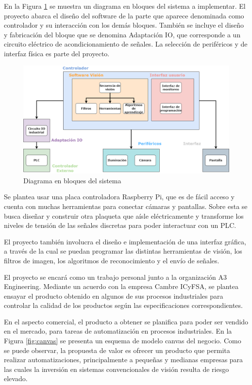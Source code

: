 \documentclass[
11pt, %
codirector, %
]{charter}
\begin{document}
En la Figura \ref{fig:diagBloques} se muestra un diagrama en bloques del sistema a implementar. El proyecto abarca el diseño del software de la parte que aparece denominada como controlador y su interacción con los demás bloques. También se incluye el diseño y fabricación del bloque que se denomina Adaptación IO, que corresponde a un circuito eléctrico de acondicionamiento de señales. La selección de periféricos y de interfaz física es parte del proyecto. 

\begin{figure}[htpb]
\centering 
\includegraphics[width=.8\textwidth]{./Figuras/TPF_CEIA_diagrama_bloques.png}
\caption{Diagrama en bloques del sistema}
\label{fig:diagBloques}
\end{figure}

Se plantea usar una placa controladora Raspberry Pi, que es de fácil acceso y cuenta con muchas herramientas para conectar cámaras y pantallas. Sobre esta se busca diseñar y construir otra plaqueta que aísle eléctricamente y transforme los niveles de tensión de las señales discretas para poder interactuar con un PLC.

El proyecto también involucra el diseño e implementación de una interfaz gráfica, a través de la cual se puedan programar las distintas herramientas de visión, los filtros de imagen, los algoritmos de reconocimiento y el envío de señales.

El proyecto se encará como un trabajo personal junto a la organización A3 Engineering. Mediante un acuerdo con la empresa Cambre ICyFSA, se plantea ensayar el producto obtenido en algunos de sus procesos industriales para controlar la calidad de los productos según las especificaciones correspondientes.

En el aspecto comercial, el producto a obtener se planifica para poder ser vendido en el mercado, para tareas de automatización en procesos industriales. En la Figura \ref{fig:canvas} se presenta un esquema de modelo canvas del negocio. Como se puede observar, la propuesta de valor es ofrecer un producto que permita realizar automatizaciones, principalmente a pequeñas y medianas empresas para las cuales la inversión en sistemas convencionales de visión resulta de riesgo elevado.
\end{document}
